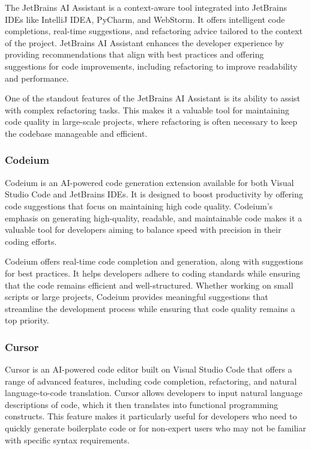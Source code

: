 The JetBrains AI Assistant \cite{JetBrainsAIAssistant} is a context-aware tool integrated into JetBrains IDEs like IntelliJ IDEA, PyCharm, and WebStorm. It offers intelligent code completions, real-time suggestions, and refactoring advice tailored to the context of the project. JetBrains AI Assistant enhances the developer experience by providing recommendations that align with best practices and offering suggestions for code improvements, including refactoring to improve readability and performance.

One of the standout features of the JetBrains AI Assistant is its ability to assist with complex refactoring tasks. This makes it a valuable tool for maintaining code quality in large-scale projects, where refactoring is often necessary to keep the codebase manageable and efficient.

\subsubsection{Codeium}

Codeium \cite{Codeium} is an AI-powered code generation extension available for both Visual Studio Code and JetBrains IDEs. It is designed to boost productivity by offering code suggestions that focus on maintaining high code quality. Codeium's emphasis on generating high-quality, readable, and maintainable code makes it a valuable tool for developers aiming to balance speed with precision in their coding efforts.

Codeium offers real-time code completion and generation, along with suggestions for best practices. It helps developers adhere to coding standards while ensuring that the code remains efficient and well-structured. Whether working on small scripts or large projects, Codeium provides meaningful suggestions that streamline the development process while ensuring that code quality remains a top priority.

\subsubsection{Cursor}

Cursor is an AI-powered code editor built on Visual Studio Code that offers a range of advanced features, including code completion, refactoring, and natural language-to-code translation. Cursor allows developers to input natural language descriptions of code, which it then translates into functional programming constructs. This feature makes it particularly useful for developers who need to quickly generate boilerplate code or for non-expert users who may not be familiar with specific syntax requirements.

